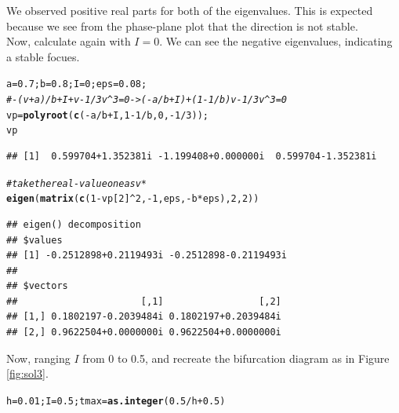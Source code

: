 \documentclass[8pt]{article}\usepackage[]{graphicx}\usepackage[]{color}
\makeatletter
\newcommand{\hlnum}[1]{\textcolor[rgb]{0.686,0.059,0.569}{#1}}%
\newcommand{\hlcom}[1]{\textcolor[rgb]{0.678,0.584,0.686}{\textit{#1}}}%
\newcommand{\hlopt}[1]{\textcolor[rgb]{0,0,0}{#1}}%
\newcommand{\hlstd}[1]{\textcolor[rgb]{0.345,0.345,0.345}{#1}}%
\newcommand{\hlkwb}[1]{\textcolor[rgb]{0.69,0.353,0.396}{#1}}%
\newcommand{\hlkwd}[1]{\textcolor[rgb]{0.737,0.353,0.396}{\textbf{#1}}}%
\newenvironment{kframe}{%
 \def\at@end@of@kframe{}%
 \ifinner\ifhmode%
  \def\at@end@of@kframe{\end{minipage}}%
  \begin{minipage}{\columnwidth}%
 \fi\fi%
 \def\FrameCommand##1{\hskip\@totalleftmargin \hskip-\fboxsep
 \colorbox{shadecolor}{##1}\hskip-\fboxsep
     \hskip-\linewidth \hskip-\@totalleftmargin \hskip\columnwidth}%
 \MakeFramed {\advance\hsize-\width
   \@totalleftmargin\z@ \linewidth\hsize
   \@setminipage}}%
 {\par\unskip\endMakeFramed%
 \at@end@of@kframe}
\newenvironment{knitrout}{}{} %
\makeatother
\begin{document}
\begin{enumerate}
We observed positive real parts for both of the eigenvalues. This is expected because we see from the phase-plane plot that the direction is not stable.\\
Now, calculate again with $I=0$. We can see the negative eigenvalues, indicating a stable focues.\\
\begin{knitrout}
\color{fgcolor}\begin{kframe}
\begin{alltt}
\hlstd{a}\hlkwb{=}\hlnum{0.7}\hlstd{;b}\hlkwb{=}\hlnum{0.8}\hlstd{; I}\hlkwb{=}\hlnum{0}\hlstd{;eps}\hlkwb{=}\hlnum{0.08}\hlstd{;}
\hlcom{#-(v+a)/b+I+v-1/3v^3=0 -> (-a/b+I)+(1-1/b)v-1/3v^3=0}
\hlstd{vp}\hlkwb{=}\hlkwd{polyroot}\hlstd{(}\hlkwd{c}\hlstd{(}\hlopt{-}\hlstd{a}\hlopt{/}\hlstd{b}\hlopt{+}\hlstd{I,}\hlnum{1}\hlopt{-}\hlnum{1}\hlopt{/}\hlstd{b,}\hlnum{0}\hlstd{,}\hlopt{-}\hlnum{1}\hlopt{/}\hlnum{3}\hlstd{));}
\hlstd{vp}
\end{alltt}
\begin{verbatim}
## [1]  0.599704+1.352381i -1.199408+0.000000i  0.599704-1.352381i
\end{verbatim}
\begin{alltt}
\hlcom{# take the real-value one as v*}
\hlkwd{eigen}\hlstd{(}\hlkwd{matrix}\hlstd{(}\hlkwd{c}\hlstd{(}\hlnum{1}\hlopt{-}\hlstd{vp[}\hlnum{2}\hlstd{]}\hlopt{^}\hlnum{2}\hlstd{,}\hlopt{-}\hlnum{1}\hlstd{,eps,}\hlopt{-}\hlstd{b}\hlopt{*}\hlstd{eps),}\hlnum{2}\hlstd{,}\hlnum{2}\hlstd{))}
\end{alltt}
\begin{verbatim}
## eigen() decomposition
## $values
## [1] -0.2512898+0.2119493i -0.2512898-0.2119493i
## 
## $vectors
##                      [,1]                 [,2]
## [1,] 0.1802197-0.2039484i 0.1802197+0.2039484i
## [2,] 0.9622504+0.0000000i 0.9622504+0.0000000i
\end{verbatim}
\end{kframe}
\end{knitrout}
Now, ranging $I$ from 0 to 0.5, and recreate the bifurcation diagram as in Figure \ref{fig:sol3}.\\
\begin{knitrout}
\color{fgcolor}\begin{kframe}
\begin{alltt}
\hlstd{h}\hlkwb{=}\hlnum{0.01}\hlstd{; I}\hlkwb{=}\hlnum{0.5}\hlstd{; tmax}\hlkwb{=}\hlkwd{as.integer}\hlstd{(}\hlnum{0.5}\hlopt{/}\hlstd{h}\hlopt{+}\hlnum{0.5}\hlstd{)}

\end{alltt}
\end{kframe}
\end{knitrout}
\end{enumerate}
\end{document}
